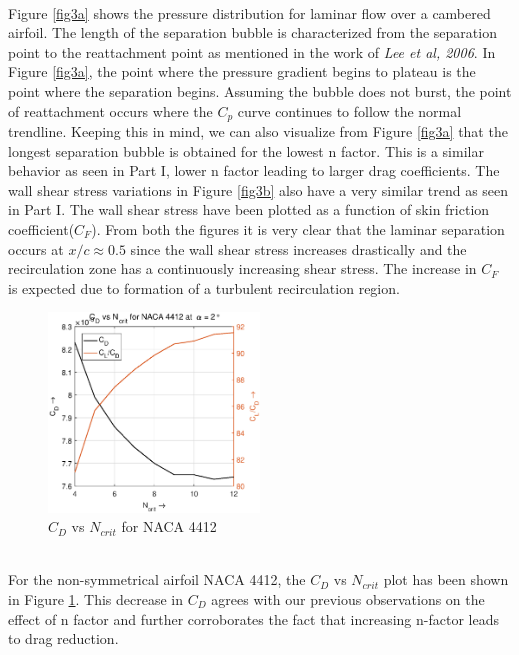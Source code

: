 \documentclass[main.tex]{subfiles}
\begin{document}
\\\indent Figure \ref{fig3a} shows the pressure distribution for laminar flow over a cambered airfoil. The length of the separation bubble is characterized from the separation point to the reattachment point as mentioned in the work of \textit{Lee et al, 2006\cite{chen2008design}}. In Figure \ref{fig3a}, the point where the pressure gradient begins to plateau is the point where the separation begins. Assuming the bubble does not burst, the point of reattachment occurs where the $C_p$ curve continues to follow the normal trendline. Keeping this in mind, we can also visualize from Figure \ref{fig3a} that the longest separation bubble is obtained for the lowest n factor. This is a similar behavior as seen in Part I, lower n factor leading to larger drag coefficients. The wall shear stress variations in Figure \ref{fig3b} also have a very similar trend as seen in Part I. The wall shear stress have been plotted as a function of skin friction coefficient($C_F$). From both the figures it is very clear that the laminar separation occurs at $x/c\approx 0.5$ since the wall shear stress increases drastically and the recirculation zone has a continuously increasing shear stress. The increase in $C_F$ is expected due to formation of a turbulent recirculation region.\vspace*{-0.7em}
\begin{figure}[h!]
\centering
\includegraphics[width=0.5\textwidth]{./Images/Ass2/CdvsNcrit_NACA4412} 
\caption{$C_D$ vs $N_{crit}$ for NACA 4412}
\label{Fig4}
\end{figure}\vspace*{-0.7em}
\\\indent For the non-symmetrical airfoil NACA 4412, the $C_D$ vs $N_{crit}$ plot has been shown in Figure \ref{Fig4}. This decrease in $C_D$ agrees with our previous observations on the effect of n factor and further corroborates the fact that increasing n-factor leads to drag reduction.
\end{document}
